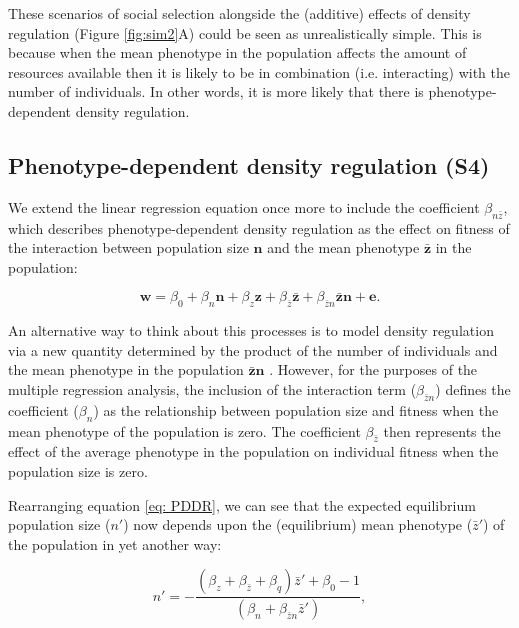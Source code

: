 \documentclass{article}
\begin{document}
These scenarios of social selection alongside the (additive) effects of density regulation (Figure \ref{fig:sim2}A) could be seen as unrealistically simple. This is because when the mean phenotype in the population affects the amount of resources available then it is likely to be in combination (i.e. interacting) with the number of individuals. In other words, it is more likely that there is phenotype-dependent density regulation. 

\subsection{Phenotype-dependent density regulation (S4)}

We extend the linear regression equation once more to include the coefficient $\beta_{n \bar{z}}$, which describes phenotype-dependent density regulation as the effect on fitness of the interaction between population size $\mathbf{n}$ and the mean phenotype $\bar{\mathbf{z}}$ in the population: 

\begin{equation} \label{eq: PDDR}
\mathbf{w}=\beta_{0} +\beta_{n} \mathbf{n} + \beta_{z} \mathbf{z}+ \beta_{\bar{z}} \bar{\mathbf{z}} + \beta_{\bar{z}n} \bar{\mathbf{z}} \mathbf{n}  +  \mathbf{e}.
\end{equation}

An alternative way to think about this processes is to model density regulation via a new quantity determined by the product of the number of individuals and the mean phenotype in the population $\bar{\mathbf{z}}\mathbf{n}$ \citep{Engen2020}. However, for the purposes of the multiple regression analysis, the inclusion of the interaction term ($\beta_{\bar{z}n}$) defines the coefficient ($\beta_{n}$) as the relationship between population size and fitness when the mean phenotype of the population is zero. The coefficient $ \beta_{\bar{z}}$ then represents the effect of the average phenotype in the population on individual fitness when the population size is zero. 

Rearranging equation \ref{eq: PDDR}, we can see that the expected equilibrium population size ($n'$) now depends upon the (equilibrium) mean phenotype ($\bar{z}'$) of the population in yet another way:

\begin{equation}
n' = -\frac{(\beta_{z}  + \beta_{\bar{z}} + \beta_{q})\bar{z}'+\beta_{0} -1}{(\beta_{n} +  \beta_{\bar{z}n} \bar{z}')},
\end{equation}
\end{document}

